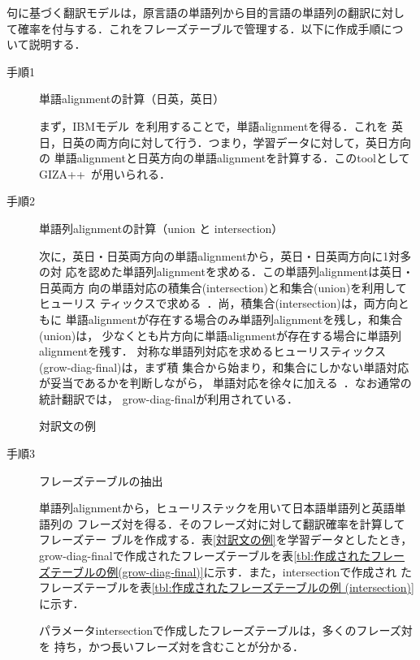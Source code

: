 \documentclass[japanese]{jnlp_1.4}
\begin{document}
句に基づく翻訳モデルは，原言語の単語列から目的言語の単語列の翻訳に対し
て確率を付与する．これをフレーズテーブルで管理する．以下に作成手順につ
いて説明する．



\begin{description}

\item[手順1] 単語alignmentの計算（日英，英日）

まず，IBMモデル~\cite{IBM}を利用することで，単語alignmentを得る．これを
英日，日英の両方向に対して行う．つまり，学習データに対して，英日方向の
単語alignmentと日英方向の単語alignmentを計算する．このtoolとして
GIZA++~\cite{giza}が用いられる．


\item[手順2] 単語列alignmentの計算（union と intersection）

次に，英日・日英両方向の単語alignmentから，英日・日英両方向に1対多の対
応を認めた単語列alignmentを求める．この単語列alignmentは英日・日英両方
向の単語対応の積集合(intersection)と和集合(union)を利用してヒューリス
ティックスで求める~\cite{Och}．尚，積集合(intersection)は，両方向ともに
単語alignmentが存在する場合のみ単語列alignmentを残し，和集合(union)は，
少なくとも片方向に単語alignmentが存在する場合に単語列alignmentを残す．
対称な単語列対応を求めるヒューリスティックス(grow-diag-final)は，まず積
集合から始まり，和集合にしかない単語対応が妥当であるかを判断しながら，
単語対応を徐々に加える~\cite{tsukuba}．なお通常の統計翻訳では，
grow-diag-finalが利用されている．

\begin{table}[b]
\caption{対訳文の例}
\label{対訳文の例}

\end{table}

\item[手順3] フレーズテーブルの抽出

単語列alignmentから，ヒューリステックを用いて日本語単語列と英語単語列の
フレーズ対を得る．そのフレーズ対に対して翻訳確率を計算してフレーズテー
ブルを作成する．表\ref{対訳文の例}を学習データとしたとき，
grow-diag-finalで作成されたフレーズテーブルを表\ref{tbl:作成されたフレー
  ズテーブルの例(grow-diag-final)}に示す．また，intersectionで作成され
たフレーズテーブルを表\ref{tbl:作成されたフレーズテーブルの例
  (intersection)}に示す．

パラメータintersectionで作成したフレーズテーブルは，多くのフレーズ対を
持ち，かつ長いフレーズ対を含むことが分かる．

\end{description}
\end{document}
